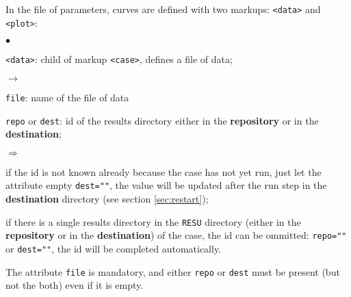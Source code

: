 \documentclass[a4paper,10pt,twoside]{csshortdoc}
\begin{document}
In the file of parameters, curves are defined with two markups:
\texttt{<data>} and \texttt{<plot>}:

\begin{list}{$\bullet$}{}
\item \texttt{<data>}: child of markup \texttt{<case>}, defines a file of data;
\begin{list}{$\rightarrow$}{}
\item \texttt{file}: name of the file of data
\item \texttt{repo} or \texttt{dest}: id of the results directory either in the
\textbf{repository} or in the \textbf{destination};
\begin{list}{$\Rightarrow$}{}
\item if the id is not known already because the case has not yet run, just let
the attribute empty \texttt{dest=""}, the value will be updated after the run
step in the \textbf{destination} directory (see section \ref{sec:restart});
\item if there is a single results directory in the \texttt{RESU} directory
(either in the \textbf{repository} or in the \textbf{destination}) of the case,
the id can be ommitted: \texttt{repo=""} or \texttt{dest=""}, the id will be
completed automatically.
\end{list}
\end{list}
The attribute \texttt{file} is mandatory, and either \texttt{repo} or
\texttt{dest} must be present (but not the both) even if it is empty.


\end{list}
\end{document}
